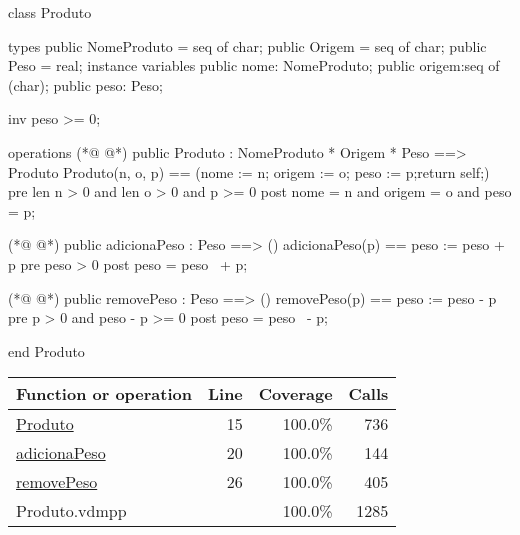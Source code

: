 \begin{vdmpp}[breaklines=true]
class Produto

types
 public NomeProduto = seq of char;
 public Origem = seq of char;
 public Peso = real;
instance variables
  public nome: NomeProduto;
  public origem:seq of (char);
  public peso: Peso;
  
  inv peso >= 0;

operations
(*@
\label{Produto:15}
@*)
  public  Produto : NomeProduto * Origem * Peso ==> Produto
  Produto(n, o, p) == (nome := n; origem := o; peso := p;return self;)
  pre len n > 0 and len o > 0 and p >= 0
  post nome = n and origem = o and peso = p;

(*@
\label{adicionaPeso:20}
@*)
  public  adicionaPeso : Peso ==> ()
  adicionaPeso(p) == peso := peso + p
  pre peso > 0
  post peso = peso~ + p;
  

(*@
\label{removePeso:26}
@*)
  public  removePeso : Peso ==> ()
  removePeso(p) == peso := peso - p
  pre p > 0 and peso - p >= 0
  post peso = peso~ - p;


end Produto
\end{vdmpp}
\bigskip
\begin{longtable}{|l|r|r|r|}
\hline
Function or operation & Line & Coverage & Calls \\
\hline
\hline
\hyperref[Produto:15]{Produto} & 15&100.0\% & 736 \\
\hline
\hyperref[adicionaPeso:20]{adicionaPeso} & 20&100.0\% & 144 \\
\hline
\hyperref[removePeso:26]{removePeso} & 26&100.0\% & 405 \\
\hline
\hline
Produto.vdmpp & & 100.0\% & 1285 \\
\hline
\end{longtable}

